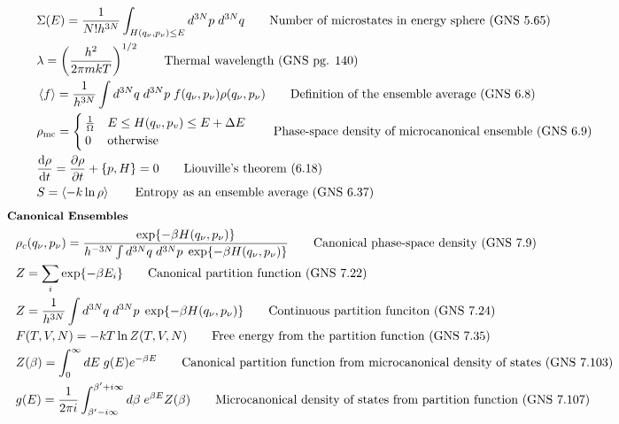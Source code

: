 \documentclass[10pt]{article}
\newcommand{\tder}[2]{\frac{\dd #1}{\dd #2}}
\newcommand{\pder}[2]{\frac{\partial #1}{\partial #2}}
\newcommand{\lrp}[1]{\left( #1 \right)}
\begin{document}
\begin{multicols}{2}
\begin{align*}
		& \Sigma(E) = \frac{1}{N! h^{3N}} \int_{H(q_\nu,p_\nu) \leq E} d^{3N}p \; d^{3N}q	\tag*{Number of microstates in energy sphere (GNS 5.65)} \\
		& \lambda = \lrp{\frac{h^2}{2 \pi mkT}}^{1/2}	\tag*{Thermal wavelength (GNS pg. 140)} \\
		& \expval{f} =  \frac{1}{h^{3N}}\int d^{3N} q \; d^{3N} p \; f(q_\nu,p_\nu) \rho (q_\nu, p_{\nu})	\tag*{Definition of the ensemble average (GNS 6.8)} \\
		& \rho_{\text{mc}} = \begin{cases}
			\frac{1}{\Omega} & E \leq H(q_v,p_v) \leq E + \Delta E \\
			0	& \text{otherwise} \\
		\end{cases}	\tag*{Phase-space density of microcanonical ensemble (GNS 6.9)} \\
		& \tder{\rho}{t} = \pder{\rho}{t} + \{ p,H \} = 0	\tag*{Liouville's theorem (6.18)} \\
		& S = \expval{-k \ln \rho}	\tag*{Entropy as an ensemble average (GNS 6.37)} \\
	\end{align*}	
	\setlength{\abovedisplayskip}{-25pt}
	\setlength{\belowdisplayskip}{-10pt}
	\setlength{\abovedisplayshortskip}{0pt}
	\setlength{\belowdisplayshortskip}{0pt}
	\begin{align*} 
	& \small \hspace{-7pt} \textbf{Canonical Ensembles} \small \\
		& \rho_c(q_\nu,p_\nu) = \frac{\exp\{ - \beta H(q_\nu,p_\nu ) \}}{h^{-3N} \int d^{3N}q \; d^{3N}p \; \exp \{ -\beta H(q_\nu, p_\nu) \}}	\tag*{Canonical phase-space density (GNS 7.9)} \\
		& Z = \sum_i \exp \{ - \beta E_i \}	\tag*{Canonical partition function (GNS 7.22)} \\
		& Z = \frac{1}{h^{3N}} \int d^{3N}q \; d^{3N}p \; \exp{-\beta H(q_\nu,p_\nu)}	\tag*{Continuous partition funciton (GNS 7.24)} \\
		& F(T,V,N) = -kT \ln Z(T,V,N)	\tag*{Free energy from the partition function (GNS 7.35)} \\
		& Z(\beta) = \int_0^\infty dE \; g(E) e^{-\beta E}	\tag*{Canonical partition function from microcanonical density of states (GNS 7.103)} \\
		& g(E) = \frac{1}{2 \pi i} \int_{\beta'-i \infty}^{\beta'+i \infty} d \beta \; e^{\beta E} Z(\beta)	\tag*{Microcanonical density of states from partition function (GNS 7.107)} \\

\end{align*}
\end{multicols}
\end{document}
